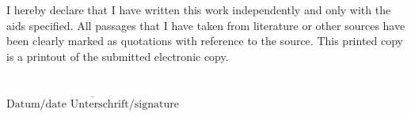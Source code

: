 \documentclass[%
    paper=A4,               %
    twoside=true,           %
    openright,              %
    parskip=full,           %
    chapterprefix=true,     %
    11pt,                   %
    headings=normal,        %
    bibliography=totoc,     %
    listof=totoc,           %
    titlepage=on,           %
    captions=tableabove,    %
    chapterprefix=false,    %
    appendixprefix=false,   %
    draft=false,            %
]{scrreprt}%
\begin{document}
I hereby declare that I have written this work independently and only with the aids specified. All passages that I have taken from literature or other sources have been clearly marked as quotations with reference to the source.
This printed copy is a printout of the submitted electronic copy.\\ \\ \\

$\overline{\text{Datum/date Unterschrift/signature}}$
\cleardoublepage


\cleardoublepage

\newpage
\mbox{}

\end{document}
